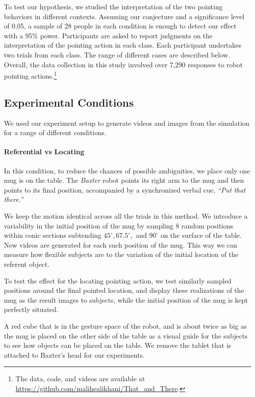 \documentclass[letterpaper]{article} %
\begin{document}
To test our hypothesis, we studied the interpretation of the two pointing behaviors in different contexts. Assuming our conjecture and a significance level of 0.05, a sample of 28 people in each condition is enough to detect our effect with a 95\% power.  Participants are asked to report judgments on the interpretation of the pointing action in each class.  Each participant undertakes two trials from each class.  The range of different cases are described below.  Overall, the data collection in this study involved over 7,290 responses to robot pointing actions.\footnote{ The data, code, and videos are available at  \url{https://github.com/malihealikhani/That_and_There}.}

\subsection{Experimental Conditions}

We used our experiment setup to generate videos and images from the simulation for a range of different conditions.

\paragraph{Referential vs Locating}
In this condition, to reduce the chances of possible ambiguities, we place only one mug is on the table. The \textit{Baxter} robot points its right arm to the mug and then points to its final position, accompanied by a synchronized verbal cue, \textit{``Put that there.''}

We keep the motion identical across all the trials in this method. 
We introduce a variability in the initial position of the mug by sampling $8$ random positions within conic sections subtending $45^{\circ} , 67.5^{\circ}, $ and $90^{\circ}$ on the surface of the table. New videos are generated for each such position of the mug.
This way we can measure how flexible subjects are to the variation of the initial location of the referent object. 

To test the effect for the locating pointing action, we test similarly sampled positions around the final pointed location, and display these realizations of the mug as the result images to subjects, while the initial position of the mug is kept perfectly situated. 

A red cube that is in the gesture space of the robot, and is about twice as big as the mug is placed on the other side of the table as a visual guide for the subjects to see how objects can be placed on the table. We remove the tablet that is attached to Baxter's head for our experiments.\\ 
\end{document}
